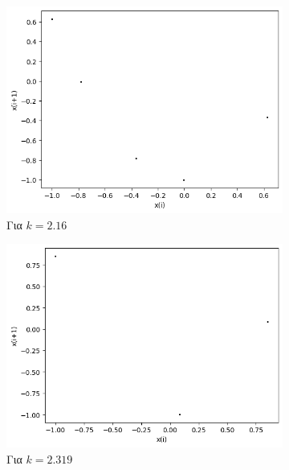 \begin{figure}[ht]
\begin{subfigure}[b]{0.4\textwidth}
		\includegraphics[width=\textwidth]{LateX images/cheb q=0.9/g6}
		\caption{Για $k=2.16$}
		\label{f:k144}
	\end{subfigure}
	\hfill
	\begin{subfigure}[b]{0.4\textwidth}
		\centering
		\includegraphics[width=\textwidth]{LateX images/cheb q=0.9/g7}
		\caption{Για $k=2.319$}
		\label{f:k145}
	\end{subfigure}
	\hfill
	\begin{subfigure}[b]{0.4\textwidth}
		\centering

\end{subfigure}
\end{figure}
